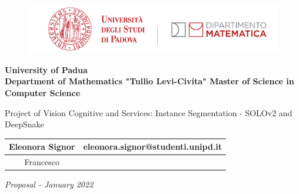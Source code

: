 \documentclass[10pt,a4paper, italian]{article}
\begin{document}
\begin{figure}[H]
\centering
  \includegraphics[width=0.6\linewidth]{./img/logo_dip.png}
   \label{fig: logo-unip-dipartimento-matematica}
\end{figure}
\vspace{1cm}
\begin{center}\Large{\textbf{University of Padua \\ Department of Mathematics "Tullio Levi-Civita" Master of Science in Computer Science}}\end{center}
\vspace{5cm}
\begin{center}\Large{Project of Vision Cognitive and Services: Instance Segmentation - SOLOv2 and DeepSnake\\ }\end{center}
\begin{flushright} 
\vspace{1cm}

\begin{table}[h]
\begin{center}
\begin{tabular}{|c|c|}
\hline
Eleonora Signor & eleonora.signor@studenti.unipd.it\\
\hline
Francesco & \\
\hline
\end{tabular}
\end{center}
\end{table}

\vspace{4cm}
\textit{Proposal - January 2022}\\
\end{flushright}
\pagebreak

\setcounter{section}{0}
\setcounter{page}{1}
\newpage
\end{document}
